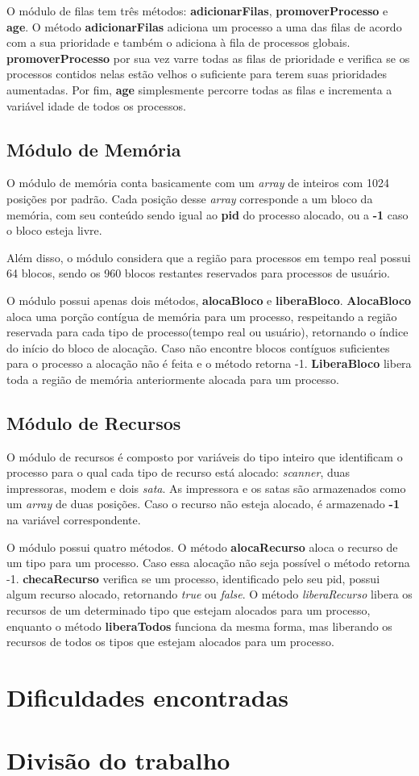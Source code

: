 \documentclass[a4paper]{article}
\begin{document}
O módulo de filas tem três métodos: \textbf{adicionarFilas}, \textbf{promoverProcesso} e \textbf{age}. O método \textbf{adicionarFilas} adiciona um processo a uma das filas de acordo com a sua prioridade e também o adiciona à fila de processos globais. \textbf{promoverProcesso} por sua vez varre todas as filas de prioridade e verifica se os processos contidos nelas estão velhos o suficiente para terem suas prioridades aumentadas. Por fim, \textbf{age} simplesmente percorre todas as filas e incrementa a variável idade de todos os processos.


\subsection{Módulo de Memória}
	O módulo de memória conta basicamente com um \emph{array} de inteiros com 1024 posições por padrão. Cada posição desse \emph{array} corresponde a um bloco da memória, com seu conteúdo sendo igual ao \textbf{pid} do processo alocado, ou a \textbf{-1} caso o bloco esteja livre.
	
	Além disso, o módulo considera que a região para processos em tempo real possui 64 blocos, sendo os 960 blocos restantes reservados para processos de usuário.
	
	O módulo possui apenas dois métodos, \textbf{alocaBloco} e \textbf{liberaBloco}. \textbf{AlocaBloco} aloca uma porção contígua de memória para um processo, respeitando a região reservada para cada tipo de processo(tempo real ou usuário), retornando o índice do início do bloco de alocação. Caso não encontre blocos contíguos suficientes para o processo a alocação não é feita e o método retorna -1. \textbf{LiberaBloco} libera toda a região de memória anteriormente alocada para um processo.

\subsection{Módulo de Recursos}
	O módulo de recursos é composto por variáveis do tipo inteiro que identificam o processo para o qual cada tipo de recurso está alocado: \emph{scanner}, duas impressoras, modem e dois \emph{sata}. As impressora e os satas são armazenados como um \emph{array} de duas posições. Caso o recurso não esteja alocado, é armazenado \textbf{-1} na variável correspondente.

	O módulo possui quatro métodos. O método \textbf{alocaRecurso} aloca o recurso de um tipo para um processo. Caso essa alocação não seja possível o método retorna -1. \textbf{checaRecurso} verifica se um processo, identificado pelo seu pid, possui algum recurso alocado, retornando \emph{true} ou \emph{false}. O método \emph{liberaRecurso} libera os recursos de um determinado tipo que estejam alocados para um processo, enquanto o método \textbf{liberaTodos} funciona da mesma forma, mas liberando os recursos de todos os tipos que estejam alocados para um processo.
	
\section{Dificuldades encontradas}

\section{Divisão do trabalho}


\end{document}
